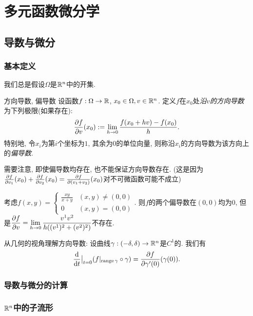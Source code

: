\chapter{多元函数微分学}

\section{导数与微分}

\subsection{基本定义}

我们总是假设$\Omega$是$\mathbb{R} ^n$中的开集. 

\begin{definition}{方向导数, 偏导数}
    设函数$f:\Omega \to \mathbb{R}$, $x_0 \in \Omega , v \in \mathbb{R} ^n$. 定义$f$在$x_0$处\textit{沿$v$的方向导数}为下列极限(如果存在): $$\frac{\partial f}{\partial v}(x_0) := \lim_{h \to 0} \frac{f(x_0+hv)-f(x_0)}{h}.$$
    特别地, 令$x_i$为第$i$个坐标为$1$, 其余为$0$的单位向量, 则称沿$x_i$的方向导数为该方向上的\textit{偏导数}. 
\end{definition}

需要注意, 即使偏导数均存在, 也不能保证方向导数存在. (这是因为$\frac{\partial f}{\partial v_1}(x_0) + \frac{\partial f}{\partial v_2}(x_0) = \frac{\partial f}{\partial (v_1+v_2)}(x_0)$对不可微函数可能不成立)

\begin{example}
	考虑$f(x,y)=\begin{cases}
		\frac{xy}{x+y} & (x,y) \neq (0,0) \\ 0 & (x,y)=(0,0)
	\end{cases}$. 则$f$的两个偏导数在$(0,0)$均为$0$, 但是$\displaystyle \frac{\partial f}{\partial v} = \lim_{h \to 0} \frac{v^1v^2}{h((v^1)^2+(v^2)^2)}$不存在. 
\end{example}

从几何的视角理解方向导数: 设曲线$\gamma :(-\delta,\delta) \to \mathbb{R} ^n$是$C^1$的. 我们有$$\frac{\mathop{}\!\mathrm{d}}{\mathop{}\!\mathrm{d} t} \big|_{t=0} (f|_{\operatorname{range} \gamma} \circ \gamma) = \frac{\partial f}{\partial \gamma '(0)} (\gamma (0)). $$



\subsection{导数与微分的计算}

\subsection{$\mathbb{R} ^n$中的子流形}

